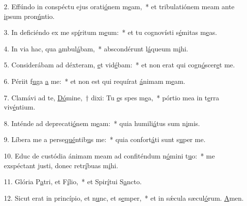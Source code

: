 2. Effúndo in conspéctu ejus orati\uline{ó}nem m\uline{e}am,~* et tribulatiónem meam ante \uline{i}psum pron\uline{ú}ntio.\par 
3. In deficiéndo ex me sp\uline{í}ritum m\uline{e}um:~* et tu cognovísti s\uline{é}mitas m\uline{e}as.\par 
4. In via hac, qua \uline{a}mbul\uline{á}bam,~* abscondérunt l\uline{á}queum m\uline{i}hi.\par 
5. Considerábam ad déxteram, \uline{e}t vid\uline{é}bam:~* et non erat qui cogn\uline{ó}scer\uline{e}t me.\par 
6. Périit f\uline{u}ga \uline{a} me:~* et non est qui requírat \uline{á}nimam m\uline{e}am.\par 
7. Clamávi ad te, \uline{Dó}mine,~† dixi: Tu \uline{e}s spes m\uline{e}a,~* pórtio mea in t\uline{e}rra viv\uline{é}ntium.\par 
8. Inténde ad deprecati\uline{ó}nem m\uline{e}am:~* quia humili\uline{á}tus sum n\uline{i}mis.\par 
9. Líbera me a perse\uline{qué}ntib\uline{u}s me:~* quia confort\uline{á}ti sunt s\uline{u}per me.\par 
10. Educ de custódia ánimam meam ad confiténdum n\uline{ó}mini t\uline{u}o:~* me exspéctant justi, donec retr\uline{í}buas m\uline{i}hi.\par 
11. Glória P\uline{a}tri, et F\uline{í}lio,~* et Spir\uline{í}tui S\uline{a}ncto.\par 
12. Sicut erat in princípio, et n\uline{u}nc, et s\uline{e}mper,~* et in sǽcula sæcul\uline{ó}rum. \uline{A}men.\par 
